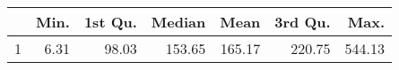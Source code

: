 \begin{table}[ht]
\centering
\begin{tabular}{rrrrrrr}
  \hline
 & Min. & 1st Qu. & Median & Mean & 3rd Qu. & Max. \\ 
  \hline
1 & 6.31 & 98.03 & 153.65 & 165.17 & 220.75 & 544.13 \\ 
   \hline
\end{tabular}
\end{table}
